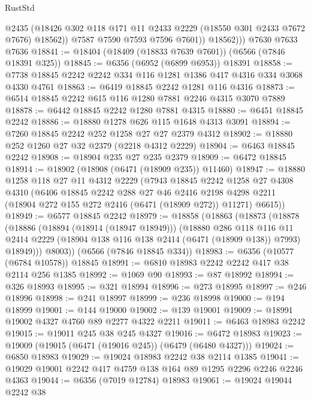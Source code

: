 \begin{lexlean}{RustStd}
\begin{coremodule}
{\begin{coremodule}
{{{{{{{{{{{{{{{{{{{{{{{{{{                @2435
                (@18426 @302 @118 @171 @11 @2433 @2229 (@18550 @301 @2433 @7672 @7676) @18562))
              @7587
              @7590
              @7593
              @7596
              @7601))
          @18562)))
    @7630
    @7633
    @7636
@18841 := @18404 (@18409 (@18833 @7639 @7601)) (@6566 (@7846 @18391 @325))
@18845 := @6356 (@6952 (@6899 @6953)) @18391
@18858 := @7738 @18845 @2242 @2242 @334 @116 @1281 @1386 @417 @4316 @334 @3068 @4330 @4761
@18863 := @6419 @18845 @2242 @1281 @116 @4316
@18873 := @6514 @18845 @2242 @615 @116 @1280 @7881 @2246 @4315 @3070 @7889
@18878 := @6442 @18845 @2242 @1280 @7881 @4315
@18880 := @6451 @18845 @2242
@18886 := @18880 @1278 @626 @115 @1648 @4313 @3091
@18894 := @7260 @18845 @2242 @252 @1258 @27 @27 @2379 @4312
@18902 := @18880 @252 @1260 @27 @32 @2379 (@2218 @4312 @2229)
@18904 := @6463 @18845 @2242
@18908 := @18904 @235 @27 @235 @2379
@18909 := @6472 @18845
@18914 := @18902 (@18908 (@6471 (@18909 @235)) @11460)
@18947 := @18880
    @1258
    @118
    @27
    @11
    @4312
    @2229
    (@7943
      @18845
      @2242
      @1258
      @27
      @4308
      @4310
      (@6406
        @18845
        @2242
        @288
        @27
        @46
        @2416
        @2198
        @4298
        @2211
        (@18904 @272 @155 @272 @2416 (@6471 (@18909 @272)) @11271)
        @6615))
@18949 := @6577 @18845 @2242
@18979 := @18858
    (@18863
      (@18873
        (@18878
          (@18886
            (@18894 (@18914 (@18947 @18949)))
            (@18880
              @286
              @118
              @116
              @11
              @2414
              @2229
              (@18904 @138 @116 @138 @2414 (@6471 (@18909 @138)) @7993)
              @18949)))
        @8003))
    (@6566 (@7846 @18845 @334))
@18983 := @6356 (@10577 (@6784 @10578)) @18845
@18991 := @6810 @18983 @2242 @2242 @417 @38 @2114 @256 @1385
@18992 := @1069 @90
@18993 := @87 @18992
@18994 := @326 @18993
@18995 := @321 @18994
@18996 := @273 @18995
@18997 := @246 @18996
@18998 := @241 @18997
@18999 := @236 @18998
@19000 := @194 @18999
@19001 := @144 @19000
@19002 := @139 @19001
@19009 := @18991 @19002 @4327 @4760 @89 @2277 @4322 @2211
@19011 := @6463 @18983 @2242
@19015 := @19011 @245 @38 @245 @4327
@19016 := @6472 @18983
@19023 := @19009 (@19015 (@6471 (@19016 @245)) (@6479 (@6480 @4327)))
@19024 := @6850 @18983
@19029 := @19024 @18983 @2242 @38 @2114 @1385
@19041 := @19029 @19001 @2242 @417 @4759 @138 @164 @89 @1295 @2296 @2246 @2246 @4363
@19044 := @6356 (@7019 @12784) @18983
@19061 := @19024
    @19044
    @2242
    @38
}}}}}}}}}}}}}}}}}}}}}}}}}}
\end{coremodule}}
\end{coremodule}
\end{lexlean}
